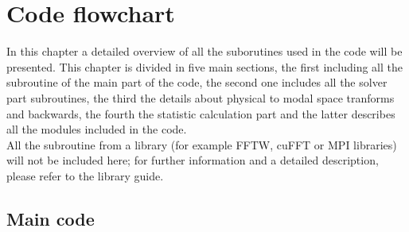 \chapter{Code flowchart}
\label{chap: flowchart}
In this chapter a detailed overview of all the suborutines used in the code will be presented. This chapter is divided in five main sections, the first including all the subroutine of the main part of the code, the second one includes all the solver part subroutines, the third the details about physical to modal space tranforms and backwards,  the fourth the statistic calculation part and the latter describes all the modules included in the code.\\
All the subroutine from a library (for example FFTW, cuFFT or MPI libraries) will not be included here; for further information and a detailed description, please refer to the library guide.

\section{Main code}


